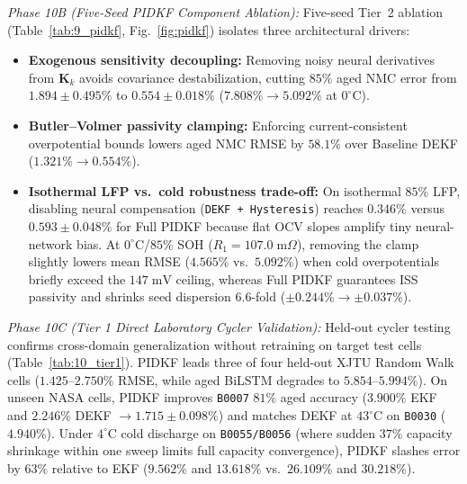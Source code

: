 \documentclass[10pt,a4paper]{article}
\begin{document}
\emph{Phase 10B (Five-Seed PIDKF Component Ablation):} Five-seed Tier~2 ablation (Table~\ref{tab:9_pidkf}, Fig.~\ref{fig:pidkf}) isolates three architectural drivers:
\begin{itemize}
\item \textbf{Exogenous sensitivity decoupling:} Removing noisy neural derivatives from $\mathbf{K}_k$ avoids covariance destabilization, cutting $85\%$ aged NMC error from $1.894\pm0.495\%$ to $0.554\pm0.018\%$ ($7.808\% \rightarrow 5.092\%$ at $0^\circ\text{C}$).
\item \textbf{Butler--Volmer passivity clamping:} Enforcing current-consistent overpotential bounds lowers aged NMC RMSE by $58.1\%$ over Baseline DEKF ($1.321\% \rightarrow 0.554\%$).
\item \textbf{Isothermal LFP vs.\ cold robustness trade-off:} On isothermal $85\%$ LFP, disabling neural compensation (\texttt{DEKF + Hysteresis}) reaches $0.346\%$ versus $0.593\pm0.048\%$ for Full PIDKF because flat OCV slopes amplify tiny neural-network bias. At $0^\circ\text{C}$/$85\%$ SOH ($R_1 = 107.0\;\mathrm{m}\Omega$), removing the clamp slightly lowers mean RMSE ($4.565\%$ vs.\ $5.092\%$) when cold overpotentials briefly exceed the $147\;\mathrm{mV}$ ceiling, whereas Full PIDKF guarantees ISS passivity and shrinks seed dispersion $6.6$-fold ($\pm 0.244\% \rightarrow \pm 0.037\%$).
\end{itemize}

\emph{Phase 10C (Tier 1 Direct Laboratory Cycler Validation):} Held-out cycler testing confirms cross-domain generalization without retraining on target test cells (Table~\ref{tab:10_tier1}). PIDKF leads three of four held-out XJTU Random Walk cells ($1.425\text{--}2.750\%$ RMSE, while aged BiLSTM degrades to $5.854\text{--}5.994\%$). On unseen NASA cells, PIDKF improves \texttt{B0007} $81\%$ aged accuracy ($3.900\%$ EKF and $2.246\%$ DEKF $\rightarrow 1.715\pm0.098\%$) and matches DEKF at $43^\circ\text{C}$ on \texttt{B0030} ($4.940\%$). Under $4^\circ\text{C}$ cold discharge on \texttt{B0055/B0056} (where sudden $37\%$ capacity shrinkage within one sweep limits full capacity convergence), PIDKF slashes error by $63\%$ relative to EKF ($9.562\%$ and $13.618\%$ vs.\ $26.109\%$ and $30.218\%$).
\end{document}
